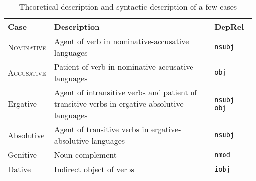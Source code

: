 \begin{table}
\centering
\begin{NiceTabular}{p{.23\columnwidth}p{.45\columnwidth}p{.15\columnwidth}}
    \toprule
    Case & Description & DepRel\\
    \midrule
    \textsc{Nominative} & Agent of verb in nominative-accusative languages & \tt nsubj \\
    \midrule
    \textsc{Accusative} & Patient of verb in nominative-accusative languages & \tt obj \\
    \midrule
    Ergative & Agent of intransitive verbs and patient of transitive verbs in ergative-absolutive languages & \tt nsubj \newline obj \\
    \midrule
    Absolutive & Agent of transitive verbs in ergative-absolutive languages & \tt nsubj \\
    \midrule
    Genitive & Noun complement & \tt nmod \\
    \midrule
    Dative & Indirect object of verbs & \tt iobj \\
    \bottomrule
\end{NiceTabular}
    \caption{Theoretical description and syntactic description of a few cases}
    \label{table:desc_case}
\end{table}
